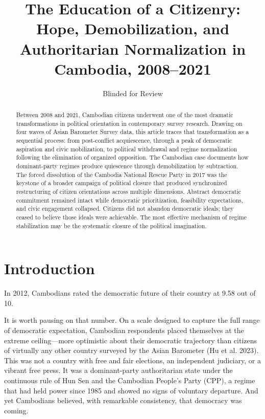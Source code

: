 \documentclass[Review,times,sageh,doublespace]{sagej}
\title{The Education of a Citizenry: Hope, Demobilization, and Authoritarian Normalization in Cambodia, 2008--2021}
\author{Blinded for Review}
\affiliation{\affilnum{1}Blinded for Review}
\begin{document}
\makeatletter\let\NAT@parse\@gobble\makeatother  %
\def\journalname{Comparative Political Studies}
\maketitle
\begin{abstract}
Between 2008 and 2021, Cambodian citizens underwent one of the most
dramatic transformations in political orientation in contemporary survey
research. Drawing on four waves of Asian Barometer Survey data, this
article traces that transformation as a sequential process: from
post-conflict acquiescence, through a peak of democratic aspiration and
civic mobilization, to political withdrawal and regime normalization
following the elimination of organized opposition. The Cambodian case
documents how dominant-party regimes produce quiescence through
demobilization by subtraction. The forced dissolution of the Cambodia
National Rescue Party in 2017 was the keystone of a broader campaign of
political closure that produced synchronized restructuring of citizen
orientations across multiple dimensions. Abstract democratic commitment
remained intact while democratic prioritization, feasibility
expectations, and civic engagement collapsed. Citizens did not abandon
democratic ideals; they ceased to believe those ideals were achievable.
The most effective mechanism of regime stabilization may be the
systematic closure of the political imagination.
\end{abstract}



\section{Introduction}\label{introduction}

In 2012, Cambodians rated the democratic future of their country at 9.58
out of 10.

It is worth pausing on that number. On a scale designed to capture the
full range of democratic expectation, Cambodian respondents placed
themselves at the extreme ceiling---more optimistic about their
democratic trajectory than citizens of virtually any other country
surveyed by the Asian Barometer (Hu et al. 2023). This was not a country
with free and fair elections, an independent judiciary, or a vibrant
free press. It was a dominant-party authoritarian state under the
continuous rule of Hun Sen and the Cambodian People's Party (CPP), a
regime that had held power since 1985 and showed no signs of voluntary
departure. And yet Cambodians believed, with remarkable consistency,
that democracy was coming.
\end{document}
